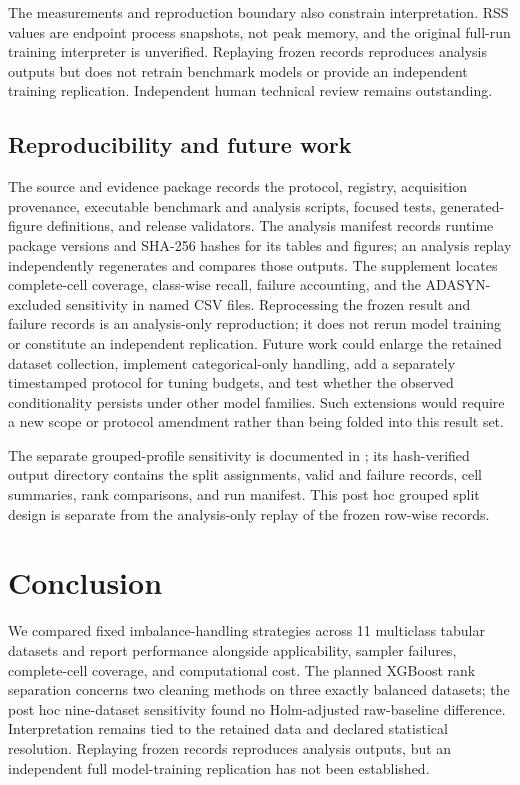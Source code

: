 \documentclass[10pt]{article}
\begin{document}
The measurements and reproduction boundary also constrain interpretation. RSS values are endpoint process snapshots, not peak memory, and the original full-run training interpreter is unverified. Replaying frozen records reproduces analysis outputs but does not retrain benchmark models or provide an independent training replication. Independent human technical review remains outstanding.

\subsection{Reproducibility and future work}

The source and evidence package records the protocol, registry, acquisition provenance, executable benchmark and analysis scripts, focused tests, generated-figure definitions, and release validators. The analysis manifest records runtime package versions and SHA-256 hashes for its tables and figures; an analysis replay independently regenerates and compares those outputs. The supplement locates complete-cell coverage, class-wise recall, failure accounting, and the ADASYN-excluded sensitivity in named CSV files. Reprocessing the frozen result and failure records is an analysis-only reproduction; it does not rerun model training or constitute an independent replication. Future work could enlarge the retained dataset collection, implement categorical-only handling, add a separately timestamped protocol for tuning budgets, and test whether the observed conditionality persists under other model families. Such extensions would require a new scope or protocol amendment rather than being folded into this result set.

The separate grouped-profile sensitivity is documented in ; its hash-verified output directory contains the split assignments, valid and failure records, cell summaries, rank comparisons, and run manifest. This post hoc grouped split design is separate from the analysis-only replay of the frozen row-wise records.

\section{Conclusion}

We compared fixed imbalance-handling strategies across 11 multiclass tabular datasets and report performance alongside applicability, sampler failures, complete-cell coverage, and computational cost. The planned XGBoost rank separation concerns two cleaning methods on three exactly balanced datasets; the post hoc nine-dataset sensitivity found no Holm-adjusted raw-baseline difference. Interpretation remains tied to the retained data and declared statistical resolution. Replaying frozen records reproduces analysis outputs, but an independent full model-training replication has not been established.
\end{document}
